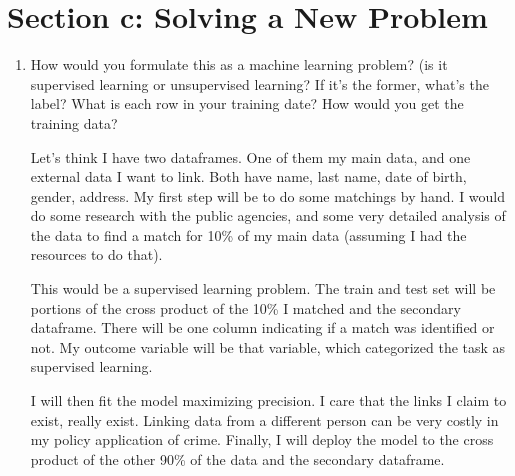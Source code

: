 \documentclass[a4paper, 11pt]{article}
\begin{document}
\section*{Section c: Solving a New Problem}
\begin{enumerate}

\item How would you formulate this as a machine learning problem? (is it supervised
learning or unsupervised learning? If it’s the former, what’s the label? What is each
row in your training date? How would you get the training data?

Let's think I have two dataframes. One of them my main data, and one external data I want to link. Both have name, last name, date of birth, gender, address. My first step will be to do some matchings by hand. I would do some research with the public agencies, and some very detailed analysis of the data to find a match for 10\% of my main data (assuming I had the resources to do that). 

This would be a supervised learning problem. The train and test set will be portions of the cross product of the 10\% I matched and the secondary dataframe. There will be one column indicating if a match was identified or not. My outcome variable will be that variable, which categorized the task as supervised learning.

I will then fit the model maximizing precision. I care that the links I claim to exist, really exist. Linking data from a different person can be very costly in my policy application of crime. Finally, I will deploy the model to the cross product of the other 90\% of the data and the secondary dataframe.


\end{enumerate}
\end{document}
